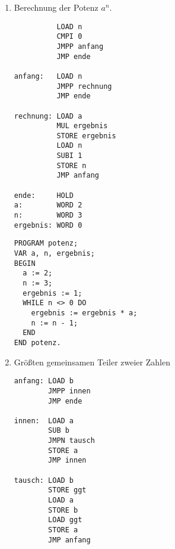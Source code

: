 \documentclass{lehramt-informatik-haupt}
\begin{document}
\begin{enumerate}
\begin{multicols}{2}
\liSpaltenUmbruch
{}

\begin{verbatim}
PROGRAM summe;
VAR n, ergebnis;

BEGIN
  n := 4;
  ergebnis := 0;
  WHILE n > 0 DO
    ergebnis := ergebnis + n;
    n := n - 1;
  END
END summe.
\end{verbatim}
\end{multicols}

%

\item Berechnung der Potenz $a^n$.

\begin{multicols}{2}

\begin{verbatim}
          LOAD n
          CMPI 0
          JMPP anfang
          JMP ende

anfang:   LOAD n
          JMPP rechnung
          JMP ende

rechnung: LOAD a
          MUL ergebnis
          STORE ergebnis
          LOAD n
          SUBI 1
          STORE n
          JMP anfang

ende:     HOLD
a:        WORD 2
n:        WORD 3
ergebnis: WORD 0
\end{verbatim}

\liSpaltenUmbruch
{}

\begin{verbatim}
PROGRAM potenz;
VAR a, n, ergebnis;
BEGIN
  a := 2;
  n := 3;
  ergebnis := 1;
  WHILE n <> 0 DO
    ergebnis := ergebnis * a;
    n := n - 1;
  END
END potenz.
\end{verbatim}
\end{multicols}

%

\item Größten gemeinsamen Teiler zweier Zahlen

\begin{multicols}{2}

\begin{verbatim}
anfang: LOAD b
        JMPP innen
        JMP ende

innen:  LOAD a
        SUB b
        JMPN tausch
        STORE a
        JMP innen

tausch: LOAD b
        STORE ggt
        LOAD a
        STORE b
        LOAD ggt
        STORE a
        JMP anfang


\end{verbatim}
\end{multicols}
\end{enumerate}
\end{document}
